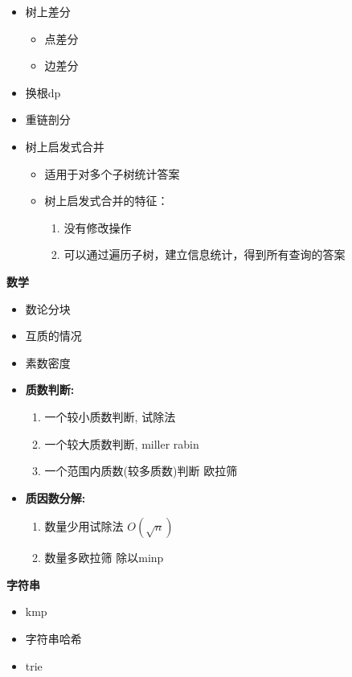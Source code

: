 \begin{itemize}
    \item 树上差分
    \begin{itemize}
        \item 点差分
        \item 边差分
    \end{itemize}
    
    \item 换根dp
    \item 重链剖分
    \item 树上启发式合并
    \begin{itemize}
        \item 适用于对多个子树统计答案
        \item 树上启发式合并的特征：
        \begin{enumerate}
            \item 没有修改操作
            \item 可以通过遍历子树，建立信息统计，得到所有查询的答案
        \end{enumerate}
    \end{itemize}
\end{itemize}

\textbf{数学}

\begin{itemize}
    \item 数论分块
    \item 互质的情况
    \item 素数密度
    \item \textbf{质数判断:}
    \begin{enumerate}
        \item 一个较小质数判断, 试除法
        \item 一个较大质数判断, miller rabin
        \item 一个范围内质数(较多质数)判断 欧拉筛
    \end{enumerate}
    \item \textbf{质因数分解:}
    \begin{enumerate}
        \item 数量少用试除法 $O(\sqrt{n})$
        \item 数量多欧拉筛 除以minp
    \end{enumerate}
\end{itemize}

\textbf{字符串}

\begin{itemize}
    \item kmp
    \item 字符串哈希
    \item trie
\end{itemize}

